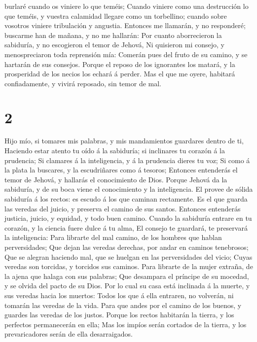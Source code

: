 burlaré cuando os viniere lo que teméis;  Cuando viniere
como una destrucción lo que teméis, y vuestra calamidad llegare como un
torbellino; cuando sobre vosotros viniere tribulación y angustia.
 Entonces me llamarán, y no responderé; buscarme han de
mañana, y no me hallarán:  Por cuanto aborrecieron la
sabiduría, y no escogieron el temor de Jehová,  Ni
quisieron mi consejo, y menospreciaron toda reprensión mía:
 Comerán pues del fruto de su camino, y se hartarán de sus
consejos.  Porque el reposo de los ignorantes los matará, y
la prosperidad de los necios los echará á perder.  Mas el
que me oyere, habitará confiadamente, y vivirá reposado, sin temor de
mal.

\hypertarget{section-1}{%
\section{2}\label{section-1}}

 Hijo mío, si tomares mis palabras, y mis mandamientos
guardares dentro de ti,  Haciendo estar atento tu oído á la
sabiduría; si inclinares tu corazón á la prudencia;  Si
clamares á la inteligencia, y á la prudencia dieres tu voz; 
Si como á la plata la buscares, y la escudriñares como á tesoros;
 Entonces entenderás el temor de Jehová, y hallarás el
conocimiento de Dios.  Porque Jehová da la sabiduría, y de
su boca viene el conocimiento y la inteligencia.  El provee
de sólida sabiduría á los rectos: es escudo á los que caminan
rectamente.  Es el que guarda las veredas del juicio, y
preserva el camino de sus santos.  Entonces entenderás
justicia, juicio, y equidad, y todo buen camino.  Cuando la
sabiduría entrare en tu corazón, y la ciencia fuere dulce á tu alma,
 El consejo te guardará, te preservará la inteligencia:
 Para librarte del mal camino, de los hombres que hablan
perversidades;  Que dejan las veredas derechas, por andar
en caminos tenebrosos;  Que se alegran haciendo mal, que se
huelgan en las perversidades del vicio;  Cuyas veredas son
torcidas, y torcidos sus caminos.  Para librarte de la
mujer extraña, de la ajena que halaga con sus palabras; 
Que desampara el príncipe de su mocedad, y se olvida del pacto de su
Dios.  Por lo cual su casa está inclinada á la muerte, y
sus veredas hacia los muertos:  Todos los que á ella
entraren, no volverán, ni tomarán las veredas de la vida. 
Para que andes por el camino de los buenos, y guardes las veredas de los
justos.  Porque los rectos habitarán la tierra, y los
perfectos permanecerán en ella;  Mas los impíos serán
cortados de la tierra, y los prevaricadores serán de ella desarraigados.

